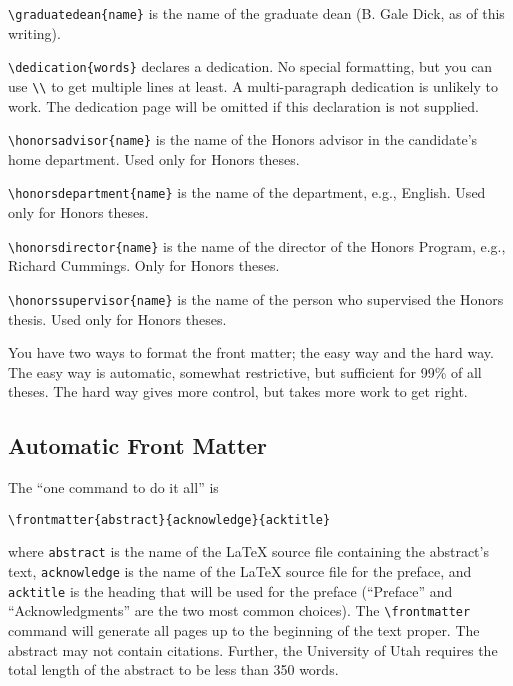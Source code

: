\begin{description}
\item \verb|\graduatedean{name}| is the name of the graduate dean (B.
Gale Dick, as of this writing).

\item \verb|\dedication{words}| declares a dedication.
No special formatting, but you can use \verb|\\| to get multiple lines
at least.  A multi-paragraph dedication is unlikely to work.
The dedication page will be omitted if this declaration is not supplied.

\item \verb|\honorsadvisor{name}| is the name of the Honors
advisor in the candidate's home department. Used only for Honors theses.

\item \verb|\honorsdepartment{name}| is the name of the department,
e.g., English. Used only for Honors theses.

\item \verb|\honorsdirector{name}| is the name of the director of the
Honors Program, e.g., Richard Cummings. Only for Honors theses.

\item \verb|\honorssupervisor{name}| is the name of the person who
supervised the Honors thesis. Used only for Honors theses.

\end{description}

You have two ways to format the front matter; the easy way and the hard way.
The easy way is automatic, somewhat restrictive, but sufficient for 99\%
of all theses.  The hard way gives more control, but takes more work to
get right.

\subsection{Automatic Front Matter}

The ``one command to do it all'' is

\hspace{4em} \verb|\frontmatter{abstract}{acknowledge}{acktitle}|

\noindent
where \verb|abstract| is the name of the \LaTeX{} source file
containing the abstract's text,
\verb|acknowledge| is the name of the \LaTeX{} source file for the
preface, and \verb|acktitle| is the heading that will be used for the
preface (``Preface'' and ``Acknowledgments'' are the two most common
choices).  The \verb|\frontmatter|
command will generate all pages up to the beginning of the text proper.
The abstract may not contain citations. Further, the University of Utah
requires the total length of the abstract to be less than 350 words.

